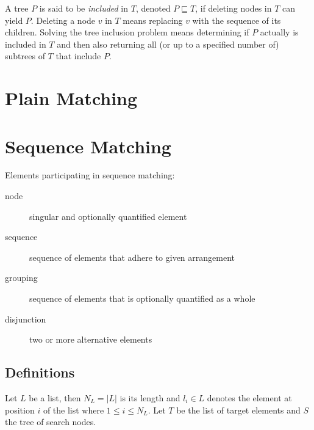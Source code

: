 \documentclass[11pt,a4paper]{report}
\begin{document}
A tree $P$ is said to be \textit{included} in $T$, denoted $P \sqsubseteq T$, if deleting nodes in $T$ can yield $P$.
Deleting a node $v$ in $T$ means replacing $v$ with the sequence of its children.
Solving the tree inclusion problem means determining if $P$ actually is included in $T$ and then also returning all (or up to a specified number of) subtrees of $T$ that include $P$.

\chapter{Plain Matching}
\label{chap:plain-matching}

\chapter{Sequence Matching}
\label{chap:sequence-matching}

Elements participating in sequence matching:
\begin{description}
	\item[node] singular and optionally quantified element
	\item[sequence] sequence of elements that adhere to given arrangement
	\item[grouping] sequence of elements that is optionally quantified as a whole
	\item[disjunction] two or more alternative elements
\end{description}

\section{Definitions}
\label{sec:seq-def}

Let $L$ be a list, then $N_L = |L|$ is its length and $l_{i} \in L$ denotes the element at position $i$ of the list where $1 \leq  i \leq N_L$.
Let $T$ be the list of target elements and $S$ the tree of search nodes.
\end{document}
